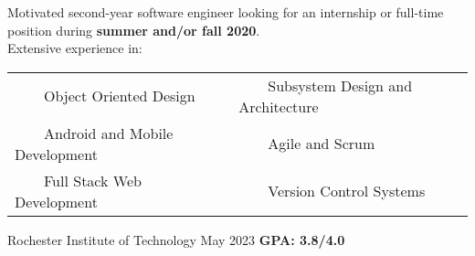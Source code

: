 \documentclass{awesome-cv}
\newcommand{\tabitem}{~~\llap{\textbullet}~~}
\begin{document}
	\makecvheader[C]

	\makecvfooter
		{}
		{}
		{}

		\vspace{-0.1cm}
		
		Motivated second-year software engineer looking for an internship or full-time position during \textbf{summer and/or fall 2020}. \\Extensive experience in:
		
		\vspace{-0.1cm}
		\begin{center}
		\begin{tabular}{l@{\hskip 2cm}l}
		\tabitem Object Oriented Design & \tabitem Subsystem Design and Architecture \\
		\tabitem Android and Mobile Development & \tabitem Agile and Scrum \\
		\tabitem Full Stack Web Development  & \tabitem Version Control Systems
		\end{tabular}




		\end{center}
		\vspace{-0.25cm}
	
		\vspace{-0.15cm}
		\begin{cventries}
			\cventryB
				{}
				{Rochester Institute of Technology\small{\textnormal{\color{graytext}{\enskip B.S. Software Engineering}}}}
				{May 2023}
				{}
                		{\textbf{GPA: 3.8/4.0}}
		\end{cventries}
		
		\vspace{-0.2cm}

			\vspace{-0.2cm}
\end{document}
